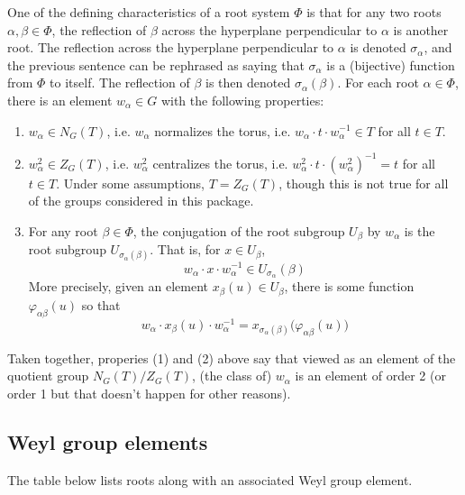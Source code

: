 \documentclass[11pt]{article}
\newcommand{\noi}{\noindent}
\newcommand{\inv}{^{-1}}
\newcommand{\sig}{\sigma}
\theoremstyle{definition}
\begin{document}
One of the defining characteristics of a root system $\Phi$ is that for any two roots $\alpha, \beta \in \Phi$, the reflection of $\beta$ across the hyperplane perpendicular to $\alpha$ is another root. The reflection across the hyperplane perpendicular to $\alpha$ is denoted $\sig_\alpha$, and the previous sentence can be rephrased as saying that $\sig_\alpha$ is a (bijective) function from $\Phi$ to itself. The reflection of $\beta$ is then denoted $\sig_\alpha(\beta)$. For each root $\alpha \in \Phi$, there is an element $w_\alpha \in G$ with the following properties:
\begin{enumerate}
	\item $w_\alpha \in N_G(T)$, i.e. $w_\alpha$ normalizes the torus, i.e. $w_\alpha \cdot t \cdot w_\alpha \inv \in T$ for all $t \in T$.
	\item $w_\alpha^2 \in Z_G(T)$, i.e. $w_\alpha^2$ centralizes the torus, i.e. $w_\alpha^2 \cdot t \cdot (w_\alpha^2) \inv = t$ for all $t \in T$. Under some assumptions, $T = Z_G(T)$, though this is not true for all of the groups considered in this package.
	\item For any root $\beta \in \Phi$, the conjugation of the root subgroup $U_\beta$ by $w_\alpha$ is the root subgroup $U_{\sig_\alpha(\beta)}$. That is, for $x \in U_\beta$,
	\[
		w_\alpha \cdot x \cdot w_\alpha \inv \in U_{\sig_{\alpha}}(\beta)
	\]
	More precisely, given an element $x_\beta(u) \in U_\beta$, there is some function $\varphi_{\alpha \beta}(u)$ so that
	\[
		w_\alpha \cdot x_\beta(u) \cdot w_\alpha \inv = x_{\sig_{\alpha}(\beta)} \Big( \varphi_{\alpha \beta}(u) \Big)
	\]
\end{enumerate}
Taken together, properies (1) and (2) above say that viewed as an element of the quotient group $N_G(T)/Z_G(T)$, (the class of) $w_\alpha$ is an element of order 2 (or order 1 but that doesn't happen for other reasons).

\subsection{Weyl group elements}

\noi The table below lists roots along with an associated Weyl group element.

\bigskip
\end{document}
